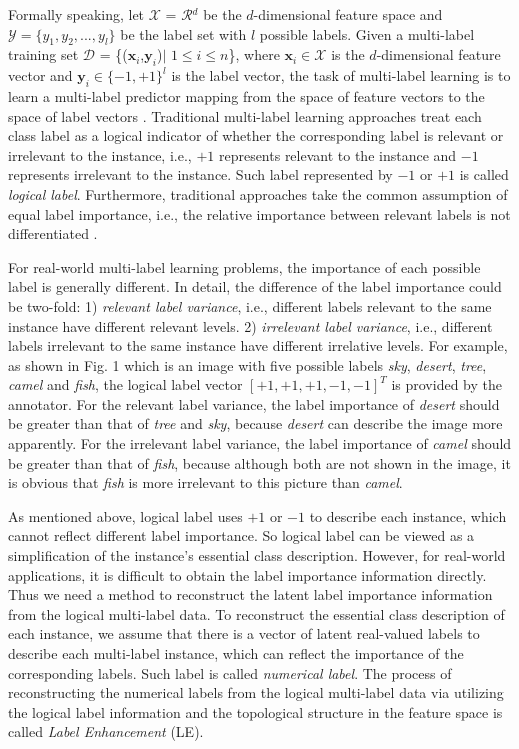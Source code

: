 \documentclass[conference]{IEEEtran}
\begin{document}
Formally speaking, let $\mathcal{X}$ = $\mathcal{R}$$^d$  be the $d$-dimensional feature space and $\mathcal{Y}=\{y_1, y_2, ... , y_l\}$ be the label set with $l$ possible labels. Given a multi-label training set $\mathcal{D}$ = \{($\bm{x}_i$,$\bm{y}_i$)$|$ $1 \leq i\leq n$\}, where $\bm{x}_i \in \mathcal{X}$ is the $d$-dimensional feature vector and $\bm{y}_i\in\{-1,+1\}^l$ is the label vector, the task of multi-label learning is to learn a multi-label predictor mapping from the space of feature vectors to the space of label vectors \cite{tsoumakas2010mining}. Traditional multi-label learning approaches treat each class label as a logical indicator of whether the corresponding label is relevant or irrelevant to the instance, i.e., $+1$ represents relevant to the instance and $-1$ represents irrelevant to the instance. Such label represented by $-1$ or $+1$ is called \emph{logical label}. Furthermore, traditional approaches take the common assumption of equal label importance, i.e., the relative importance between relevant labels is not differentiated \cite{zhang2014review}.

For real-world multi-label learning problems, the importance of each possible label is generally different. In detail, the difference of the label importance could be two-fold: 1) \emph{relevant label variance}, i.e., different labels relevant to the same instance have different relevant levels. 2) \emph{irrelevant label variance}, i.e., different labels irrelevant to the same instance have different irrelative levels. For example, as shown in Fig. 1 which is an image with five possible labels \emph{sky}, \emph{desert}, \emph{tree}, \emph{camel} and \emph{fish}, the logical label vector $[+1,+1,+1,-1,-1]^T$ is provided by the annotator. For the relevant label variance, the label importance of \emph{desert} should be greater than that of \emph{tree} and \emph{sky}, because \emph{desert} can describe the image more apparently. For the irrelevant label variance, the label importance of \emph{camel} should be greater than that of \emph{fish}, because although both are not shown in the image, it is obvious that \emph{fish} is more irrelevant to this picture than \emph{camel}.

As mentioned above, logical label uses $+1$ or $-1$ to describe each instance, which cannot reflect different label importance. So logical label can be viewed as a simplification of the instance's essential class description. However, for real-world applications, it is difficult to obtain the label importance information directly. Thus we need a method to reconstruct the latent label importance information from the logical multi-label data. To reconstruct the essential class description of each instance, we assume that there is a vector of latent real-valued labels to describe each multi-label instance, which can reflect the importance of the corresponding labels. Such label is called \emph{numerical label}. The process of reconstructing the numerical labels from the logical multi-label data via utilizing the logical label information and the topological structure in the feature space is called \emph{Label Enhancement} (LE).
\end{document}
